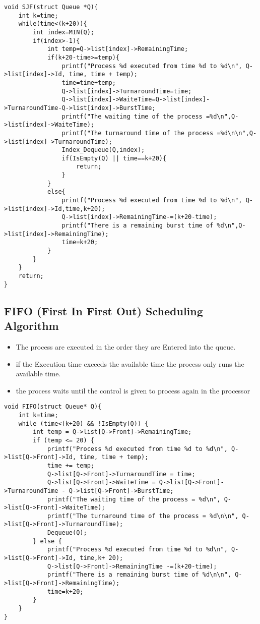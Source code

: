 \documentclass{article}
\begin{document}
\begin{lstlisting}[basicstyle=\footnotesize]
void SJF(struct Queue *Q){
    int k=time;
    while(time<(k+20)){
        int index=MIN(Q);
        if(index>-1){
            int temp=Q->list[index]->RemainingTime;
            if(k+20-time>=temp){
                printf("Process %d executed from time %d to %d\n", Q->list[index]->Id, time, time + temp);
                time=time+temp;
                Q->list[index]->TurnaroundTime=time;
                Q->list[index]->WaiteTime=Q->list[index]->TurnaroundTime-Q->list[index]->BurstTime;
                printf("The waiting time of the process =%d\n",Q->list[index]->WaiteTime);
                printf("The turnaround time of the process =%d\n\n",Q->list[index]->TurnaroundTime);
                Index_Dequeue(Q,index);
                if(IsEmpty(Q) || time==k+20){
                    return;
                }
            }
            else{
                printf("Process %d executed from time %d to %d\n", Q->list[index]->Id,time,k+20);
                Q->list[index]->RemainingTime-=(k+20-time);
                printf("There is a remaining burst time of %d\n",Q->list[index]->RemainingTime);
                time=k+20;
            }
        }
    }
    return;
}
\end{lstlisting}

\subsection{FIFO (First In First Out) Scheduling Algorithm}
\begin{itemize}
    \item The process are executed in the order they are Entered into the queue.
    \item if the Execution time exceeds the available time the process only runs the available time.
    \item the process waits until the control is given to process again in the processor
\end{itemize}

\begin{lstlisting}[basicstyle=\footnotesize]
void FIFO(struct Queue* Q){ 
    int k=time;
    while (time<(k+20) && !IsEmpty(Q)) {
        int temp = Q->list[Q->Front]->RemainingTime;
        if (temp <= 20) {
            printf("Process %d executed from time %d to %d\n", Q->list[Q->Front]->Id, time, time + temp);
            time += temp;
            Q->list[Q->Front]->TurnaroundTime = time;
            Q->list[Q->Front]->WaiteTime = Q->list[Q->Front]->TurnaroundTime - Q->list[Q->Front]->BurstTime;
            printf("The waiting time of the process = %d\n", Q->list[Q->Front]->WaiteTime);
            printf("The turnaround time of the process = %d\n\n", Q->list[Q->Front]->TurnaroundTime);
            Dequeue(Q);
        } else {
            printf("Process %d executed from time %d to %d\n", Q->list[Q->Front]->Id, time,k+ 20);
            Q->list[Q->Front]->RemainingTime -=(k+20-time);
            printf("There is a remaining burst time of %d\n\n", Q->list[Q->Front]->RemainingTime);
            time=k+20;
        }
    }
}
\end{lstlisting}
\end{document}

